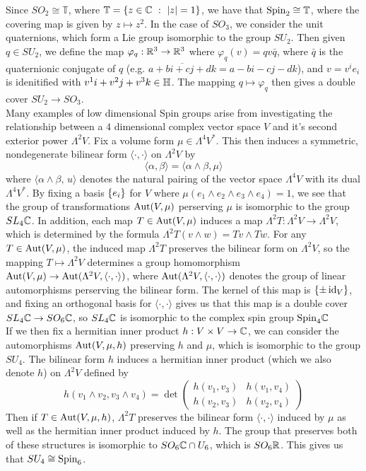%
Since $SO_2 \cong \mathbb{T}$, where $\mathbb{T} = \left\lbrace z \in \mathbb{C} ~:~ |z| = 1 \right\rbrace$,
we have that $\mathrm{Spin}_2 \cong \mathbb{T}$, where the covering map is given
by $z \mapsto z^2$. In the case of $SO_3$, we consider the unit quaternions,
which form a Lie group isomorphic to the group $SU_2$. Then given $q \in SU_2$, we define
the map $\varphi_q : \mathbb{R}^3 \to \mathbb{R}^3$ where $\varphi_q(v) = qv\bar{q}$, where
$\bar{q}$ is the quaternionic conjugate of $q$ (e.g. $\overline{a + bi + cj +dk}
= a -bi -cj -dk$), and $v = v^ie_i$ is idenitified with $v^1 i + v^2j + v^3k \in \mathbb{H}$.
The mapping $q \mapsto \varphi_q$ then gives a double cover $SU_2 \to SO_3$. \\

Many examples of low dimensional Spin groups arise from investigating the
relationship between a $4$ dimensional complex vector space $V$ and it's second
exterior power $\Lambda^2V$. Fix a volume form $\mu \in \Lambda^4V^*$. This then
induces a symmetric, nondegenerate bilinear form $\langle \cdot,\cdot \rangle$
on $\Lambda^2V$ by
\[
\langle \alpha,\beta \rangle = \langle \alpha \wedge \beta, \mu \rangle
\]
where $\langle \alpha \wedge \beta, \,u \rangle$ denotes the natural pairing of
the vector space $\Lambda^4V$ with its dual $\Lambda^4V^*$. By fixing
a basis $\left\lbrace e_i \right\rbrace$ for $V$ where $\mu(e_1 \wedge e_2 \wedge e_3 \wedge e_4) = 1$,
we see that the group of transformations $\operatorname{Aut}(V, \mu)$ perserving $\mu$ is
isomorphic to the group $SL_4\mathbb{C}$. In addition, each map $T \in \operatorname{Aut}(V, \mu)$
induces a map $\Lambda^2 T : \Lambda^2V \to \Lambda^2V$, which is determined
by the formula $\Lambda^2 T(v \wedge w) = Tv \wedge Tw$. For any $T \in \operatorname{Aut}(V, \mu)$,
the induced map $\Lambda^2 T$ preserves the bilinear form on $\Lambda^2V$, so the
mapping $T \mapsto \Lambda^2V$ determines a group homomorphism
$\operatorname{Aut}(V, \mu) \to \operatorname{Aut}(\Lambda^2V, \langle \cdot,\cdot \rangle)$, where
$\operatorname{Aut}(\Lambda^2V,\langle\cdot,\cdot\rangle)$ denotes the group of linear automorphisms
perserving the bilinear form. The kernel of this map is $\left\lbrace \pm \operatorname{id}_V \right\rbrace$, and fixing
an orthogonal basis for $\langle\cdot,\cdot\rangle$ gives us that this map is
a double cover $SL_4\mathbb{C} \to SO_6\mathbb{C}$, so $SL_4\mathbb{C}$ is isomorphic to the
complex spin group $\mathrm{Spin}_4\mathbb{C}$ \\

If we then fix a hermitian inner product $h : V \times V \to \mathbb{C}$, we can
consider the automorphisms $\operatorname{Aut}(V, \mu, h)$ preserving $h$ and $\mu$, which
is isomorphic to the group $SU_4$. The bilinear form $h$ induces a hermitian
inner product (which we also denote $h$) on $\Lambda^2V$ defined by
\[
h(v_1 \wedge v_2, v_3 \wedge v_4) = \det \begin{pmatrix}
h(v_1,v_3) & h(v_1, v_4) \\
h(v_2,v_3) & h(v_2,v_4)
\end{pmatrix}
\]
Then if $T \in \operatorname{Aut}(V,\mu,h)$, $\Lambda^2T$ preserves the bilinear form
$\langle\cdot,\cdot\rangle$ induced by $\mu$ as well as the hermitian inner
product induced by $h$. The group that preserves both of these structures
is isomorphic to $SO_6\mathbb{C} \cap U_6$, which is $SO_6\mathbb{R}$. This gives us that
$SU_4 \cong \mathrm{Spin}_6$. \\

